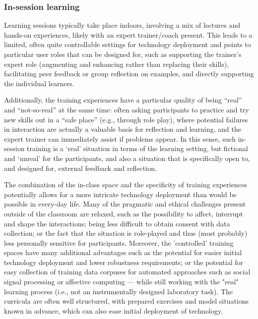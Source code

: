 \documentclass[prodmode,acmtochi]{acmsmall}
\newcommand{\GeraldineFIX}[1]{}
\begin{document}
\subsubsection{In-session learning}
Learning sessions typically take place indoors, involving a mix of lectures and hands-on experiences, likely with an expert trainer/coach present. This leads to a limited, often quite controllable settings for technology deployment and points to particular user roles that can be designed for, such as supporting the trainer's expert role (augmenting and enhancing rather than replacing their skills), facilitating peer feedback or group reflection on examples, and directly supporting the individual learners.

Additionally,  the training experiences have a particular quality of being ``real'' and ``not-so-real'' at the same time: often asking participants to practice and try new skills out in a ``safe place'' (e.g., through role play), where potential failures in interaction are actually a valuable basis for reflection and learning, and the expert trainer can immediately assist if problems appear. In this sense, such in-session training is a `real' situation in terms of the learning setting, but fictional and `unreal' for the participants, and also a situation that is specifically open to, and designed for, external feedback and reflection. 

The combination of the in-class space and the specificity of training experiences potentially allows for a more intricate\GeraldineFIX{G: not sure 'pervasive' is the right word here - what do you mean here?\ is it that it can be rolled out to lots of training contexts, or that it gets dedicated/focussed use or? } technology deployment than would be possible in every-day life. Many of the pragmatic and ethical challenges present outside of the classroom are relaxed, such as the possibility to affect, interrupt and shape the interactions; being less difficult to obtain consent with data collection; %
or the fact that the situation is role-played and thus (most probably) less personally sensitive for participants. Moreover, the 'controlled' training spaces have many additional advantages such as the potential for easier initial technology deployment and lower robustness requirements; or the potential for easy collection of training data corpuses for automated approaches such as social signal processing \GeraldineFIX{G: SSP - don't think this has been set up as an abbreviation before this? assume it is social sig  process?}or affective computing --- while still working with the "real" learning process (i.e., not an instrumentally designed laboratory task). The curricula are often well structured, with prepared exercises and model situations known in advance, which can also ease initial deployment of technology. 
\end{document}
